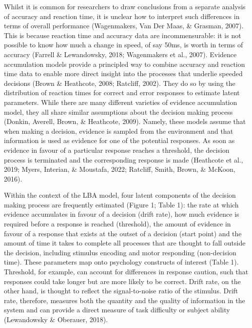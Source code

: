 \documentclass[
  english,
  man, donotrepeattitle,floatsintext]{apa6}
\begin{document}
Whilst it is common for researchers to draw conclusions from a separate analysis of accuracy and reaction time, it is unclear how to interpret such differences in terms of overall performance (Wagenmakers, Van Der Maas, \& Grasman, 2007). This is because reaction time and accuracy data are incommensurable: it is not possible to know how much a change in speed, of say 50ms, is worth in terms of accuracy (Farrell \& Lewandowsky, 2018; Wagenmakers et al., 2007). Evidence accumulation models provide a principled way to combine accuracy and reaction time data to enable more direct insight into the processes that underlie speeded decisions (Brown \& Heathcote, 2008; Ratcliff, 2002). They do so by using the distribution of reaction times for correct and error responses to estimate latent parameters. While there are many different varieties of evidence accumulation model, they all share similar assumptions about the decision making process (Donkin, Averell, Brown, \& Heathcote, 2009). Namely, these models assume that when making a decision, evidence is sampled from the environment and that information is used as evidence for one of the potential responses. As soon as evidence in favour of a particular response reaches a threshold, the decision process is terminated and the corresponding response is made (Heathcote et al., 2019; Myers, Interian, \& Moustafa, 2022; Ratcliff, Smith, Brown, \& McKoon, 2016).

Within the context of the LBA model, four latent components of the decision making process are frequently estimated (Figure 1; Table 1): the rate at which evidence accumulates in favour of a decision (drift rate), how much evidence is required before a response is reached (threshold), the amount of evidence in favour of a response that exists at the outset of a decision (start point) and the amount of time it takes to complete all processes that are thought to fall outside the decision, including stimulus encoding and motor responding (non-decision time). These parameters map onto psychology constructs of interest (Table 1). Threshold, for example, can account for differences in response caution, such that responses could take longer but are more likely to be correct. Drift rate, on the other hand, is thought to reflect the signal-to-noise ratio of the stimulus. Drift rate, therefore, measures both the quantity and the quality of information in the system and can provide a direct measure of task difficulty or subject ability (Lewandowsky \& Oberauer, 2018).
\end{document}
